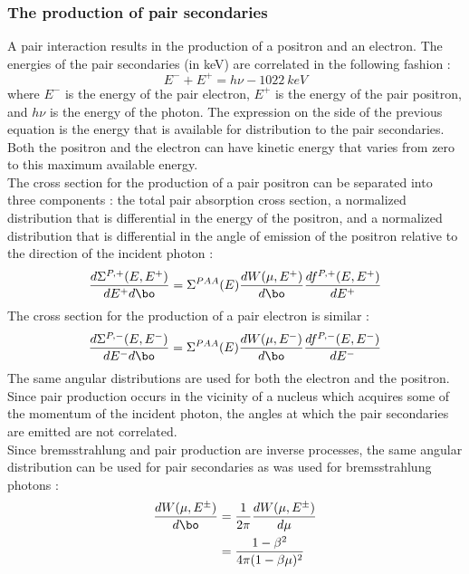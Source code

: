\subsubsection{The production of pair secondaries}
A pair interaction results in the production of a positron and an electron.
The energies of the pair secondaries (in keV) are correlated in the following
fashion :
\begin{equation}
E^- + E^+ = h \nu -1022\ keV
\end{equation}
where $E^-$ is the energy of the pair electron, $E^+$ is the
energy of the pair positron, and $h\nu$ is the energy of the photon. The
expression on the side of the previous equation is the energy that is
available for distribution to the pair secondaries. Both the positron and the
electron can have kinetic energy that varies from zero to this maximum
available energy.\\
The cross section for the production of a pair positron can be separated into
three components : the total pair absorption cross section, a normalized
distribution that is differential in the energy of the positron, and a
normalized distribution that is differential in the angle of emission of the
positron relative to the direction of the incident photon :
\begin{equation}
\frac{d\Sigma^{P,+}(E,E^+)}{dE^+ d\bo} = \Sigma^{PAA}(E)
\frac{dW(\mu,E^+)}{d\bo} \frac{df^{P,+}(E,E^+)}{dE^+}
\end{equation}
The cross section for the production of a pair electron is similar :
\begin{equation}
\frac{d\Sigma^{P,-}(E,E^-)}{dE^- d\bo} = \Sigma^{PAA}(E)
\frac{dW(\mu,E^-)}{d\bo} \frac{df^{P,-}(E,E^-)}{dE^-}
\end{equation}
The same angular distributions are used for both the electron and the
positron. Since pair production occurs in the vicinity of a nucleus which
acquires some of the momentum of the incident photon, the angles at which the
pair secondaries are emitted are not correlated.\\
Since bremsstrahlung and pair production are inverse processes, the same
angular distribution can be used for pair secondaries as was used for
bremsstrahlung photons :
\begin{equation}
\begin{split}
\frac{dW(\mu,E^{\pm})}{d\bo} &= \frac{1}{2\pi}
\frac{dW(\mu,E^{\pm})}{d\mu}\\
&= \frac{1-\beta^2}{4\pi(1-\beta \mu)^2}
\end{split}
\end{equation}

